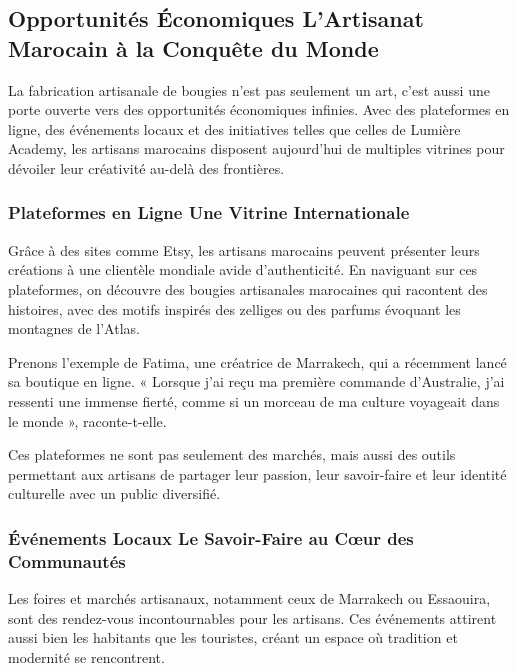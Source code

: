 \documentclass[11pt,fleqn,onecolumn,oneside]{book}
\begin{document}
\subsection*{Opportunités Économiques L'Artisanat Marocain à la Conquête du Monde}

\begin{remark}
La fabrication artisanale de bougies n'est pas seulement un art, c'est aussi une porte ouverte vers des opportunités économiques infinies. Avec des plateformes en ligne, des événements locaux et des initiatives telles que celles de Lumière Academy, les artisans marocains disposent aujourd'hui de multiples vitrines pour dévoiler leur créativité au-delà des frontières.
\end{remark}

\subsubsection*{Plateformes en Ligne Une Vitrine Internationale}

Grâce à des sites comme Etsy, les artisans marocains peuvent présenter leurs créations à une clientèle mondiale avide d'authenticité. En naviguant sur ces plateformes, on découvre des bougies artisanales marocaines qui racontent des histoires, avec des motifs inspirés des zelliges ou des parfums évoquant les montagnes de l’Atlas.

\begin{example}
Prenons l’exemple de Fatima, une créatrice de Marrakech, qui a récemment lancé sa boutique en ligne. « Lorsque j’ai reçu ma première commande d’Australie, j’ai ressenti une immense fierté, comme si un morceau de ma culture voyageait dans le monde », raconte-t-elle.
\end{example}

Ces plateformes ne sont pas seulement des marchés, mais aussi des outils permettant aux artisans de partager leur passion, leur savoir-faire et leur identité culturelle avec un public diversifié.

\subsubsection*{Événements Locaux Le Savoir-Faire au Cœur des Communautés}

Les foires et marchés artisanaux, notamment ceux de Marrakech ou Essaouira, sont des rendez-vous incontournables pour les artisans. Ces événements attirent aussi bien les habitants que les touristes, créant un espace où tradition et modernité se rencontrent.
\end{document}
